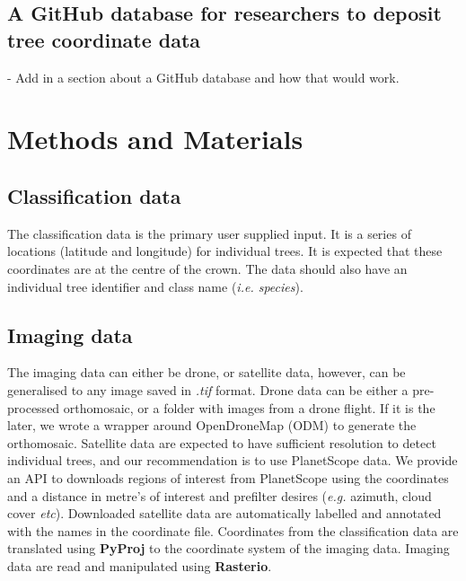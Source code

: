 \documentclass[9pt,lineno]{elife}
\begin{document}
\subsection{A GitHub database for researchers to deposit tree coordinate data}
- Add in a section about a GitHub database and how that would work.

\section{Methods and Materials}

\subsection{Classification data}
The classification data is the primary user supplied input. It is a series of locations (latitude and longitude) for individual trees. It is expected that these coordinates are at the centre of the crown. The data should also have an individual tree identifier and class name (\textit{i.e. species}).

\subsection{Imaging data}
The imaging data can either be drone, or satellite data, however, can be generalised to any image saved in \textit{.tif} format. Drone data can be either a pre-processed orthomosaic, or a folder with images from a drone flight. If it is the later, we wrote a wrapper around OpenDroneMap (ODM) to generate the orthomosaic. Satellite data are expected to have sufficient resolution to detect individual trees, and our recommendation is to use PlanetScope data. We provide an API to downloads regions of interest from PlanetScope using the coordinates and a distance in metre's of interest and prefilter desires (\textit{e.g.} azimuth, cloud cover \textit{etc}). Downloaded satellite data are automatically labelled and annotated with the names in the coordinate file. Coordinates from the classification data are translated using \textbf{PyProj} to the coordinate system of the imaging data. Imaging data are read and manipulated using \textbf{Rasterio}.

\end{document}
